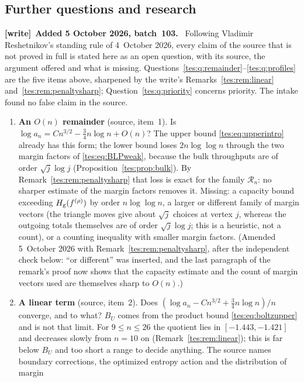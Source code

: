 \documentclass[11pt,a4paper]{article}
\theoremstyle{remark}\newtheorem{remark}[theorem]{Remark}
\newcommand{\Hg}{H_{\rm g}}\newcommand{\floor}[1]{\left\lfloor#1\right\rfloor}
\numberwithin{equation}{section}
\newenvironment{writenote}[1][]{\par\smallskip\begingroup\small
 \noindent\textbf{[write]}\if\relax\detokenize{#1}\relax\else~\textbf{#1.}\fi\ }%
 {\par\endgroup\smallskip}
\begin{document}
\subsection{Further questions and research}\label{tes:sec:further}
\begin{writenote}[Added 5 October 2026, batch~103]
Following Vladimir Reshetnikov's standing rule of 4~October 2026, every
claim of the source that is not proved in full is stated here as an open
question, with its source, the argument offered and what is missing.
Questions~\ref{tes:q:remainder}--\ref{tes:q:profiles} are the five items
above, sharpened by the write's Remarks~\ref{tes:rem:linear}
and~\ref{tes:rem:penaltysharp}; Question~\ref{tes:q:priority} concerns
priority. The intake found no false claim in the source.
\end{writenote}
\begin{enumerate}
\item\label{tes:q:remainder} \textbf{An $O(n)$ remainder} (source,
 item~1). Is $\log a_n=Cn^{3/2}-\frac34n\log n+O(n)$? The upper bound
 \eqref{tes:eq:upperintro} already has this form; the lower bound loses
 $2n\log\log n$ through the two margin factors of
 \eqref{tes:eq:BLPweak}, because the bulk throughputs are of order
 $\sqrt j\log j$ (Proposition~\ref{tes:prop:bulk}). By
 Remark~\ref{tes:rem:penaltysharp} that loss is exact for the family
 $\mathcal R_n$: no sharper estimate of the margin factors removes it.
 Missing: a capacity bound exceeding $\Hg(f^{(\rho)})$ by order
 $n\log\log n$, a larger or different family of margin vectors (the
 triangle moves give about $\sqrt j$ choices at vertex $j$, whereas the
 outgoing totals themselves are of order $\sqrt j\log j$; this is a
 heuristic, not a count), or a counting inequality with smaller margin
 factors. (Amended 5~October 2026 with Remark~\ref{tes:rem:penaltysharp},
 after the independent check below: ``or different'' was inserted, and the
 last paragraph of the remark's proof now shows that the capacity estimate
 and the count of margin vectors used are themselves sharp to $O(n)$.)
\item\label{tes:q:linear} \textbf{A linear term} (source, item~2). Does
 $(\log a_n-Cn^{3/2}+\frac34n\log n)/n$ converge, and to what? $B_U$ comes
 from the product bound \eqref{tes:eq:boltzupper} and is not that limit.
 For $9\le n\le26$ the quotient lies in $[-1.443,-1.421]$ and decreases
 slowly from $n=10$ on (Remark~\ref{tes:rem:linear}); this is far below
 $B_U$ and too short a range to decide anything. The source names boundary
 corrections, the optimized entropy action and the distribution of margin

\end{enumerate}
\end{document}
